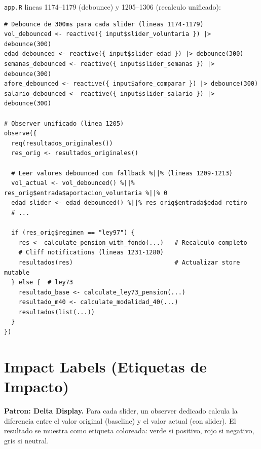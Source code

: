 \documentclass[11pt, letterpaper, twoside]{report}
\begin{document}
\begin{codigobox}
\texttt{app.R} lineas 1174--1179 (debounce) y 1205--1306 (recalculo unificado):
\begin{lstlisting}[caption={Debounce y recalculo unificado}]
# Debounce de 300ms para cada slider (lineas 1174-1179)
vol_debounced <- reactive({ input$slider_voluntaria }) |> debounce(300)
edad_debounced <- reactive({ input$slider_edad }) |> debounce(300)
semanas_debounced <- reactive({ input$slider_semanas }) |> debounce(300)
afore_debounced <- reactive({ input$afore_comparar }) |> debounce(300)
salario_debounced <- reactive({ input$slider_salario }) |> debounce(300)

# Observer unificado (linea 1205)
observe({
  req(resultados_originales())
  res_orig <- resultados_originales()

  # Leer valores debounced con fallback %||% (lineas 1209-1213)
  vol_actual <- vol_debounced() %||% res_orig$entrada$aportacion_voluntaria %||% 0
  edad_slider <- edad_debounced() %||% res_orig$entrada$edad_retiro
  # ...

  if (res_orig$regimen == "ley97") {
    res <- calculate_pension_with_fondo(...)   # Recalculo completo
    # Cliff notifications (lineas 1231-1280)
    resultados(res)                            # Actualizar store mutable
  } else {  # ley73
    resultado_base <- calculate_ley73_pension(...)
    resultado_m40 <- calculate_modalidad_40(...)
    resultados(list(...))
  }
})
\end{lstlisting}
\end{codigobox}


\section{Impact Labels (Etiquetas de Impacto)}
\label{sec:impact_labels}

\begin{patronbox}
\textbf{Patron: Delta Display.} Para cada slider, un observer dedicado calcula
la diferencia entre el valor original (baseline) y el valor actual (con slider).
El resultado se muestra como etiqueta coloreada: verde si positivo, rojo si
negativo, gris si neutral.
\end{patronbox}
\end{document}
